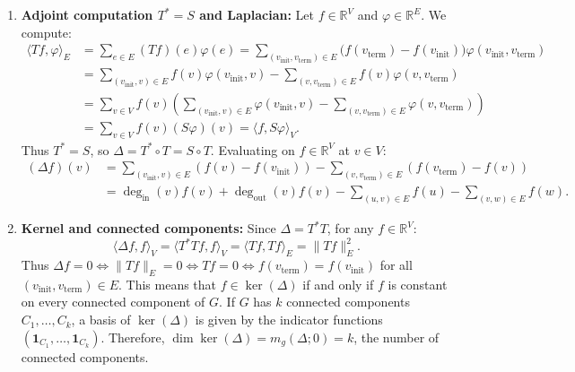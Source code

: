 \begin{exercisesolution}
\label{sol:graph_laplacian_adjoint}
\begin{enumerate}[label=\textbf{(\alph*)}]
    \item \textbf{Adjoint computation $T^* = S$ and Laplacian:}
    Let $f \in \mathbb{R}^V$ and $\varphi \in \mathbb{R}^E$. We compute:
    \begin{align*}
    \langle Tf, \varphi \rangle_E &= \sum_{e \in E} (Tf)(e) \varphi(e) = \sum_{(v_{\text{init}}, v_{\text{term}}) \in E} \big(f(v_{\text{term}}) - f(v_{\text{init}})\big) \varphi(v_{\text{init}}, v_{\text{term}}) \\
    &= \sum_{(v_{\text{init}}, v) \in E} f(v) \varphi(v_{\text{init}}, v) - \sum_{(v, v_{\text{term}}) \in E} f(v) \varphi(v, v_{\text{term}}) \\
    &= \sum_{v \in V} f(v) \left( \sum_{(v_{\text{init}}, v) \in E} \varphi(v_{\text{init}}, v) - \sum_{(v, v_{\text{term}}) \in E} \varphi(v, v_{\text{term}}) \right) \\
    &= \sum_{v \in V} f(v) (S\varphi)(v) = \langle f, S\varphi \rangle_V.
    \end{align*}
    Thus $T^* = S$, so $\Delta = T^* \circ T = S \circ T$.
    Evaluating on $f \in \mathbb{R}^V$ at $v \in V$:
    \begin{align*}
    (\Delta f)(v) &= \sum_{(v_{\text{init}}, v) \in E} (f(v) - f(v_{\text{init}})) - \sum_{(v, v_{\text{term}}) \in E} (f(v_{\text{term}}) - f(v)) \\
    &= \operatorname{deg}_{\text{in}}(v) f(v) + \operatorname{deg}_{\text{out}}(v) f(v) - \sum_{(u, v) \in E} f(u) - \sum_{(v, w) \in E} f(w).
    \end{align*}
    \item \textbf{Kernel and connected components:}
    Since $\Delta = T^* T$, for any $f \in \mathbb{R}^V$:
    \[
    \langle \Delta f, f \rangle_V = \langle T^* T f, f \rangle_V = \langle Tf, Tf \rangle_E = \|Tf\|_E^2.
    \]
    Thus $\Delta f = 0 \iff \|Tf\|_E = 0 \iff Tf = 0 \iff f(v_{\text{term}}) = f(v_{\text{init}})$ for all $(v_{\text{init}}, v_{\text{term}}) \in E$.
    This means that $f \in \ker(\Delta)$ if and only if $f$ is constant on every connected component of $G$.
    If $G$ has $k$ connected components $C_1, \dots, C_k$, a basis of $\ker(\Delta)$ is given by the indicator functions $(\mathbf{1}_{C_1}, \dots, \mathbf{1}_{C_k})$.
    Therefore, $\dim\ker(\Delta) = m_g(\Delta; 0) = k$, the number of connected components. \qedhere
\end{enumerate}
\end{exercisesolution}

